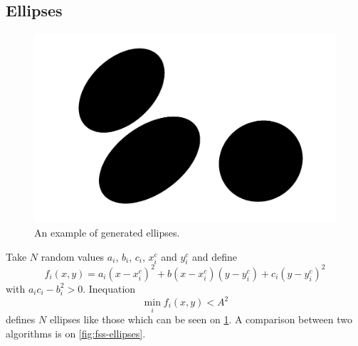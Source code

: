 \documentclass[reprint,amsmath,amssymb,aps,pre,showkeys,showpacs]{revtex4-1}
\begin{document}
\subsection{Ellipses}
\label{sec:ellipses}
\begin{figure}
  \centering
  \includegraphics[width=0.8\linewidth, frame]{images/ellipses.png}
  \caption[]{An example of generated ellipses.}
  \label{fig:ellipses}
\end{figure}
Take $N$ random values $a_i$, $b_i$, $c_i$, $x^c_i$ and $y^c_i$ and define
\begin{equation*}
  f_i(x, y) = a_i(x-x^c_i)^2 + b(x-x^c_i)(y-y^c_i) + c_i(y-y^c_i)^2
\end{equation*}
with $a_ic_i - b_i^2 > 0$. Inequation
\begin{equation*}
  \min_i f_i(x, y) < A^2
\end{equation*}
defines $N$ ellipses like those which can be seen on \cref{fig:ellipses}. A
comparison between two algorithms is on \cref{fig:fss-ellipses}.
\end{document}
